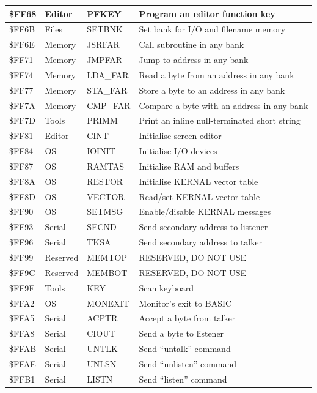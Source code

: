 \begin{longtable}{|L{2cm}|p{2cm}|p{2cm}|L{6cm}|}
\hline
\$FF68 & Editor & PFKEY & Program an editor function key \\
\hline
\$FF6B & Files & SETBNK & Set bank for I/O and filename memory \\
\hline
\$FF6E & Memory & JSRFAR & Call subroutine in any bank \\
\hline
\$FF71 & Memory & JMPFAR & Jump to address in any bank \\
\hline
\$FF74 & Memory & LDA\_FAR & Read a byte from an address in any bank \\
\hline
\$FF77 & Memory & STA\_FAR & Store a byte to an address in any bank \\
\hline
\$FF7A & Memory & CMP\_FAR & Compare a byte with an address in any bank \\
\hline
\$FF7D & Tools & PRIMM & Print an inline null-terminated short string \\
\hline
\$FF81 & Editor & CINT & Initialise screen editor \\
\hline
\$FF84 & OS & IOINIT & Initialise I/O devices \\
\hline
\$FF87 & OS & RAMTAS & Initialise RAM and buffers \\
\hline
\$FF8A & OS & RESTOR & Initialise KERNAL vector table \\
\hline
\$FF8D & OS & VECTOR & Read/set KERNAL vector table \\
\hline
\$FF90 & OS & SETMSG & Enable/disable KERNAL messages \\
\hline
\$FF93 & Serial & SECND & Send secondary address to listener \\
\hline
\$FF96 & Serial & TKSA & Send secondary address to talker \\
\hline
\$FF99 & Reserved & MEMTOP & RESERVED, DO NOT USE \\
\hline
\$FF9C & Reserved & MEMBOT & RESERVED, DO NOT USE \\
\hline
\$FF9F & Tools & KEY & Scan keyboard \\
\hline
\$FFA2 & OS & MONEXIT & Monitor's exit to BASIC \\
\hline
\$FFA5 & Serial & ACPTR & Accept a byte from talker \\
\hline
\$FFA8 & Serial & CIOUT & Send a byte to listener \\
\hline
\$FFAB & Serial & UNTLK & Send ``untalk'' command \\
\hline
\$FFAE & Serial & UNLSN & Send ``unlisten'' command \\
\hline
\$FFB1 & Serial & LISTN & Send ``listen'' command \\

\end{longtable}
